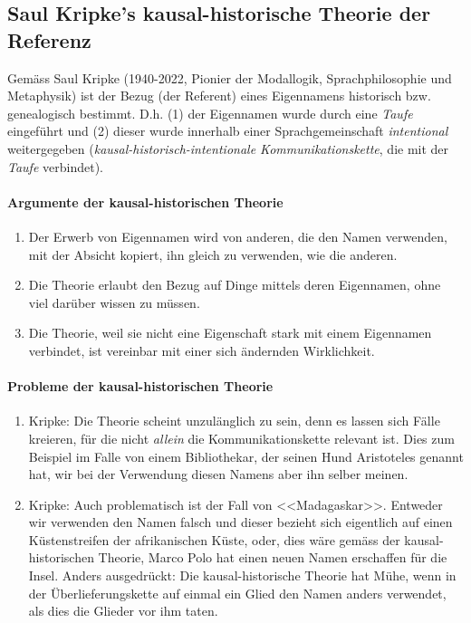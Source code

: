 \documentclass[../main.tex]{subfiles}
\begin{document}
\subsection{Saul Kripke's kausal-historische Theorie der Referenz}
Gemäss Saul Kripke (1940-2022, Pionier der Modallogik, Sprachphilosophie und Metaphysik) ist der Bezug (der Referent) eines Eigennamens historisch bzw. genealogisch bestimmt. D.h. (1) der Eigennamen wurde durch eine \textit{Taufe} eingeführt und (2) dieser wurde innerhalb einer Sprachgemeinschaft \textit{intentional} weitergegeben (\textit{kausal-historisch-intentionale Kommunikationskette}, die mit der \textit{Taufe} verbindet).

\paragraph{Argumente der kausal-historischen Theorie}
\begin{enumerate}
	\item Der Erwerb von Eigennamen wird von anderen, die den Namen verwenden, mit der Absicht kopiert, ihn gleich zu verwenden, wie die anderen.
	\item Die Theorie erlaubt den Bezug auf Dinge mittels deren Eigennamen, ohne viel darüber wissen zu müssen. 
	\item Die Theorie, weil sie nicht eine Eigenschaft stark mit einem Eigennamen verbindet, ist vereinbar mit einer sich ändernden Wirklichkeit. 
\end{enumerate}

\paragraph{Probleme der kausal-historischen Theorie}
\begin{enumerate}
	\item Kripke: Die Theorie scheint unzulänglich zu sein, denn es lassen sich Fälle kreieren, für die nicht \textit{allein} die Kommunikationskette relevant ist. Dies zum Beispiel im Falle von einem Bibliothekar, der seinen Hund Aristoteles genannt hat, wir bei der Verwendung diesen Namens aber ihn selber meinen. %
	\item Kripke: Auch problematisch ist der Fall von <<Madagaskar>>. Entweder wir verwenden den Namen falsch und dieser bezieht sich eigentlich auf einen Küstenstreifen der afrikanischen Küste, oder, dies wäre gemäss der kausal-historischen Theorie, Marco Polo hat einen neuen Namen erschaffen für die Insel. Anders ausgedrückt: Die kausal-historische Theorie hat Mühe, wenn in der Überlieferungskette auf einmal ein Glied den Namen anders verwendet, als dies die Glieder vor ihm taten. 
\end{enumerate}
\end{document}
